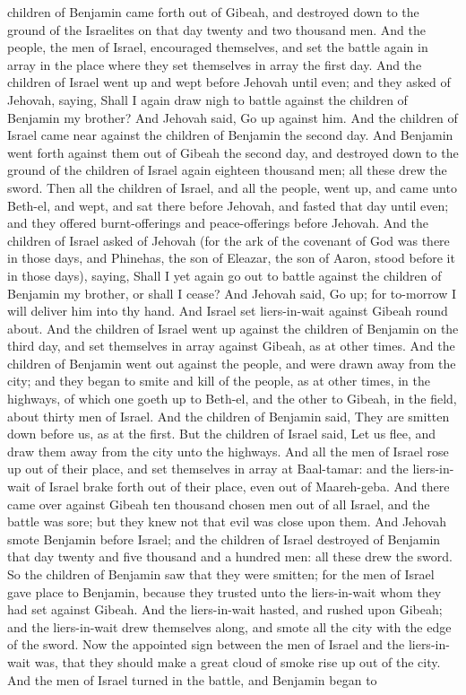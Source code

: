 children of Benjamin came forth out of Gibeah, and destroyed down to the ground of the Israelites on that day twenty and two thousand men. And the people, the men of Israel, encouraged themselves, and set the battle again in array in the place where they set themselves in array the first day. And the children of Israel went up and wept before Jehovah until even; and they asked of Jehovah, saying, Shall I again draw nigh to battle against the children of Benjamin my brother? And Jehovah said, Go up against him.  And the children of Israel came near against the children of Benjamin the second day. And Benjamin went forth against them out of Gibeah the second day, and destroyed down to the ground of the children of Israel again eighteen thousand men; all these drew the sword. Then all the children of Israel, and all the people, went up, and came unto Beth-el, and wept, and sat there before Jehovah, and fasted that day until even; and they offered burnt-offerings and peace-offerings before Jehovah. And the children of Israel asked of Jehovah (for the ark of the covenant of God was there in those days, and Phinehas, the son of Eleazar, the son of Aaron, stood before it in those days), saying, Shall I yet again go out to battle against the children of Benjamin my brother, or shall I cease? And Jehovah said, Go up; for to-morrow I will deliver him into thy hand.  And Israel set liers-in-wait against Gibeah round about. And the children of Israel went up against the children of Benjamin on the third day, and set themselves in array against Gibeah, as at other times. And the children of Benjamin went out against the people, and were drawn away from the city; and they began to smite and kill of the people, as at other times, in the highways, of which one goeth up to Beth-el, and the other to Gibeah, in the field, about thirty men of Israel. And the children of Benjamin said, They are smitten down before us, as at the first. But the children of Israel said, Let us flee, and draw them away from the city unto the highways. And all the men of Israel rose up out of their place, and set themselves in array at Baal-tamar: and the liers-in-wait of Israel brake forth out of their place, even out of Maareh-geba. And there came over against Gibeah ten thousand chosen men out of all Israel, and the battle was sore; but they knew not that evil was close upon them. And Jehovah smote Benjamin before Israel; and the children of Israel destroyed of Benjamin that day twenty and five thousand and a hundred men: all these drew the sword.  So the children of Benjamin saw that they were smitten; for the men of Israel gave place to Benjamin, because they trusted unto the liers-in-wait whom they had set against Gibeah. And the liers-in-wait hasted, and rushed upon Gibeah; and the liers-in-wait drew themselves along, and smote all the city with the edge of the sword. Now the appointed sign between the men of Israel and the liers-in-wait was, that they should make a great cloud of smoke rise up out of the city. And the men of Israel turned in the battle, and Benjamin began to 